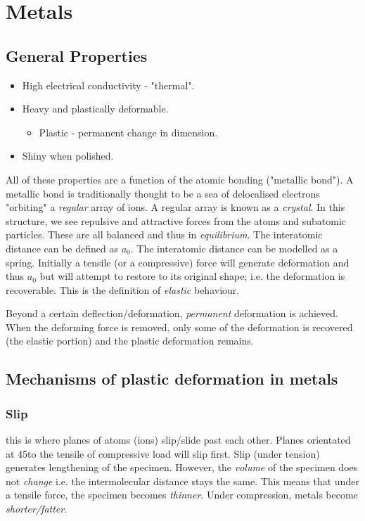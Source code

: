 \documentclass[class=report, crop=false, 12pt,a4paper]{standalone}
\begin{document}
\section{Metals}
\subsection{General Properties}
\begin{itemize}[noitemsep]
  \item High electrical conductivity - "thermal".
  \item Heavy and plastically deformable.
  \begin{itemize}
    \item Plastic - permanent change in dimension.
  \end{itemize}
  \item Shiny when polished.
\end{itemize}

All of these properties are a function of the atomic bonding ("metallic bond"). A metallic bond is traditionally thought to be a sea of delocalised electrons "orbiting" a \emph{regular} array of ions. A regular array is known as a \emph{crystal}. In this structure, we see repulsive and attractive forces from the atoms and subatomic particles. These are all balanced and thus in \emph{equilibrium}. The interatomic distance can be defined as \( a_0 \). The interatomic distance can be modelled as a spring. Initially a tensile (or a compressive) force will generate deformation and thus \( a_0 \) but will attempt to restore to its original shape; i.e. the deformation is recoverable. This is the definition of \emph{elastic} behaviour.

Beyond a certain deflection/deformation, \emph{permanent} deformation is achieved. When the deforming force is removed, only some of the deformation is recovered (the elastic portion) and the plastic deformation remains. 

\subsection{Mechanisms of plastic deformation in metals}
\subsubsection{Slip}
this is where planes of atoms (ions) slip/slide past each other. Planes orientated at 45\degree to the tensile of compressive load will slip first. Slip (under tension) generates lengthening of the specimen. However, the \emph{volume} of the specimen does not \emph{change} i.e. the intermolecular distance stays the same. This means that under a tensile force, the specimen becomes \emph{thinner}. Under compression, metals become \emph{shorter/fatter}.
\end{document}
